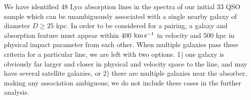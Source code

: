 \documentclass[twocolumn,tighten]{aastex6}
\begin{document}
We have identified 48 Ly$\alpha$ absorption lines in the spectra of our initial 33 QSO sample which can be unambiguously associated with a single nearby galaxy of diameter $D\geq25$ kpc. In order to be considered for a pairing, a galaxy and absorption feature must appear within 400 $\rm km\, s^{-1}$ in velocity and 500 kpc in physical impact parameter from each other. When multiple galaxies pass these criteria for a particular line, we are left with two options. 1) one galaxy is obviously far larger and closer in physical and velocity space to the line, and may have several satellite galaxies, or 2) there are multiple galaxies near the absorber, making any association ambiguous; we do not include these cases in the further analysis.

\begin{figure}[t!]
\centering

\end{figure}
\end{document}
